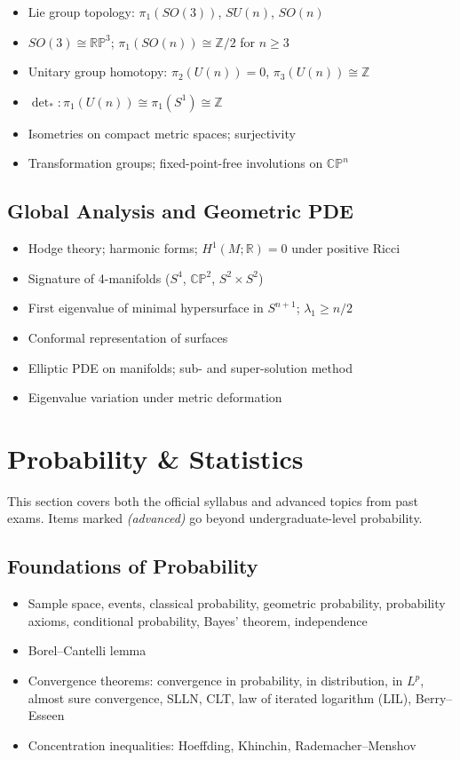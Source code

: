 \begin{itemize}
  \item Lie group topology: $\pi_1(SO(3))$, $SU(n)$, $SO(n)$
  \item $SO(3)\cong\mathbb{RP}^3$; $\pi_1(SO(n))\cong\mathbb{Z}/2$ for $n\geq3$
  \item Unitary group homotopy: $\pi_2(U(n))=0$, $\pi_3(U(n))\cong\mathbb{Z}$
  \item $\det_*: \pi_1(U(n))\cong\pi_1(S^1)\cong\mathbb{Z}$
  \item Isometries on compact metric spaces; surjectivity
  \item Transformation groups; fixed-point-free involutions on $\mathbb{CP}^n$
\end{itemize}

\subsection{Global Analysis and Geometric PDE}

\begin{itemize}
  \item Hodge theory; harmonic forms; $H^1(M;\mathbb{R})=0$ under positive Ricci
  \item Signature of 4-manifolds ($S^4$, $\mathbb{CP}^2$, $S^2\times S^2$)
  \item First eigenvalue of minimal hypersurface in $S^{n+1}$; $\lambda_1\geq n/2$
  \item Conformal representation of surfaces
  \item Elliptic PDE on manifolds; sub- and super-solution method
  \item Eigenvalue variation under metric deformation
\end{itemize}

\section{Probability \& Statistics}
\label{sec:prep-probability}

This section covers both the official syllabus and advanced topics from past exams. Items marked \textit{(advanced)} go beyond undergraduate-level probability.

\subsection{Foundations of Probability}

\begin{itemize}
  \item Sample space, events, classical probability, geometric probability, probability axioms, conditional probability, Bayes' theorem, independence
  \item Borel--Cantelli lemma
  \item Convergence theorems: convergence in probability, in distribution, in $L^p$, almost sure convergence, SLLN, CLT, law of iterated logarithm (LIL), Berry--Esseen
  \item Concentration inequalities: Hoeffding, Khinchin, Rademacher--Menshov
\end{itemize}

